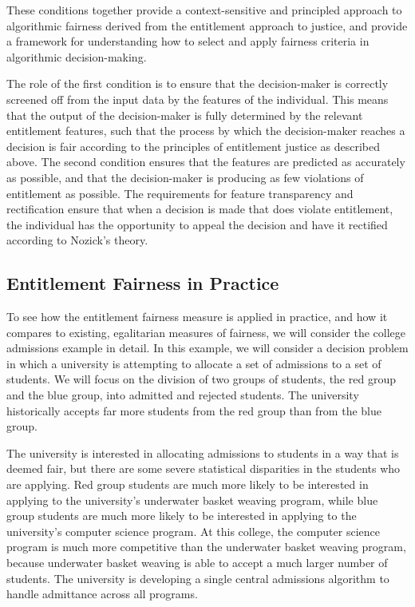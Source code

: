 These conditions together provide a context-sensitive and principled approach to
algorithmic fairness derived from the entitlement approach to justice, and 
provide a framework for understanding how to select and apply fairness criteria
in algorithmic decision-making.

The role of the first condition is to ensure that the decision-maker is
correctly screened off from the input data by the features of the individual.
This means that the output of the decision-maker is fully determined by the
relevant entitlement features, such that the process by which the decision-maker
reaches a decision is fair according to the principles of entitlement justice as
described above. The second condition ensures that the features are predicted
as accurately as possible, and that the decision-maker is producing as few 
violations of entitlement as possible. The requirements for feature
transparency and rectification ensure that when a decision is made that does 
violate entitlement, the individual has the opportunity to appeal the decision
and have it rectified according to Nozick's theory.

\subsection{Entitlement Fairness in Practice}

To see how the entitlement fairness measure is applied in practice, and how it 
compares to existing, egalitarian measures of fairness, we will consider the
college admissions example in detail. In this example, we will consider a
decision problem in which a university is attempting to allocate a set of
admissions to a set of students. We will focus on the division of two groups of
students, the red group and the blue group, into admitted and rejected students.
The university historically accepts far more students from the red group than
from the blue group.

The university is interested in allocating admissions to students in a way that
is deemed fair, but there are some severe statistical disparities in the
students who are applying. Red group students are much more likely to be
interested in applying to the university's underwater basket weaving program,
while blue group students are much more likely to be interested in applying to
the university's computer science program. At this college, the computer science 
program is much more competitive than the underwater basket weaving program,
because underwater basket weaving is able to accept a much larger number of
students. The university is developing a single central admissions algorithm to
handle admittance across all programs.

